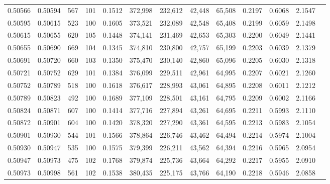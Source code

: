 \begin{tabular}{rrrrrrrrrrrrr}
0.50566 & 0.50594 &   567 & 101 &                                     0.1512 & 372,998 & 232,612 &  42,448 &  65,508 & 0.2197 & 0.6068 & 2.1547 \\
0.50595 & 0.50615 &   523 & 100 &                                     0.1605 & 373,521 & 232,089 &  42,548 &  65,408 & 0.2199 & 0.6059 & 2.1498 \\
0.50615 & 0.50655 &   620 & 105 &                                     0.1448 & 374,141 & 231,469 &  42,653 &  65,303 & 0.2200 & 0.6049 & 2.1441 \\
0.50655 & 0.50690 &   669 & 104 &                                     0.1345 & 374,810 & 230,800 &  42,757 &  65,199 & 0.2203 & 0.6039 & 2.1379 \\
0.50691 & 0.50720 &   660 & 103 &                                     0.1350 & 375,470 & 230,140 &  42,860 &  65,096 & 0.2205 & 0.6030 & 2.1318 \\
0.50721 & 0.50752 &   629 & 101 &                                     0.1384 & 376,099 & 229,511 &  42,961 &  64,995 & 0.2207 & 0.6021 & 2.1260 \\
0.50752 & 0.50789 &   518 & 100 &                                     0.1618 & 376,617 & 228,993 &  43,061 &  64,895 & 0.2208 & 0.6011 & 2.1212 \\
0.50789 & 0.50823 &   492 & 100 &                                     0.1689 & 377,109 & 228,501 &  43,161 &  64,795 & 0.2209 & 0.6002 & 2.1166 \\
0.50824 & 0.50871 &   607 & 100 &                                     0.1414 & 377,716 & 227,894 &  43,261 &  64,695 & 0.2211 & 0.5993 & 2.1110 \\
0.50872 & 0.50901 &   604 & 100 &                                     0.1420 & 378,320 & 227,290 &  43,361 &  64,595 & 0.2213 & 0.5983 & 2.1054 \\
0.50901 & 0.50930 &   544 & 101 &                                     0.1566 & 378,864 & 226,746 &  43,462 &  64,494 & 0.2214 & 0.5974 & 2.1004 \\
0.50930 & 0.50947 &   535 & 100 &                                     0.1575 & 379,399 & 226,211 &  43,562 &  64,394 & 0.2216 & 0.5965 & 2.0954 \\
0.50947 & 0.50973 &   475 & 102 &                                     0.1768 & 379,874 & 225,736 &  43,664 &  64,292 & 0.2217 & 0.5955 & 2.0910 \\
0.50973 & 0.50998 &   561 & 102 &                                     0.1538 & 380,435 & 225,175 &  43,766 &  64,190 & 0.2218 & 0.5946 & 2.0858 \\

\end{tabular}
